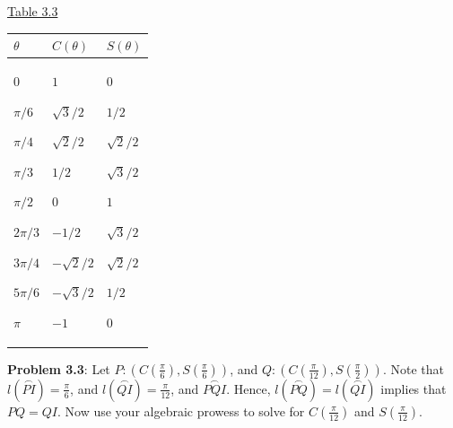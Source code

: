 \documentclass[english]{book}
\newcommand{\arc}[1]{\overset{\frown}{#1} }
\begin{document}
\begin{center}
\underline{Table 3.3}
\end{center}
\begin{table}[htbp]
\begin{center}
\begin{tabular}{|p{40pt}|p{40pt}|p{40pt}|}
\hline $\theta$ & $C(\theta)$ & $S(\theta)$ \\
\hline $0$ \par $\pi/6$ \par $\pi/4$ \par $\pi/3$ \par $\pi/2$ \par $2\pi/3$ \par $3\pi/4$ \par $5\pi/6$ \par $\pi$
& $1$ \par $\sqrt{3}/2$ \par $\sqrt{2}/2$ \par $1/2$ \par $0$ \par $-1/2$ \par $-\sqrt{2}/2$ \par $-\sqrt{3}/2$ \par $-1$
& $0$ \par $1/2$ \par $\sqrt{2}/2$ \par $\sqrt{3}/2$ \par $1$ \par $\sqrt{3}/2$ \par $\sqrt{2}/2$ \par $1/2$ \par $0$ \\
\hline
\end{tabular}
\label{tbl3.3hints}
\end{center}
\end{table}

\textbf{Problem 3.3}: Let $P:(C(\frac{\pi}{6}),S(\frac{\pi}{6}))$, and $Q:(C(\frac{\pi}{12}),S(\frac{\pi}{2}))$. Note that $l(\arc{PI}) = \frac{\pi}{6}$, and $l(\arc{QI}) = \frac{\pi}{12}$, and $\arc{PQI}$. Hence, $l(\arc{PQ}) = l(\arc{QI})$ implies that $PQ = QI$. Now use your algebraic prowess to solve for $C(\frac{\pi}{12})$ and $S(\frac{\pi}{12})$.

\vspace{0.3cm}
\end{document}
